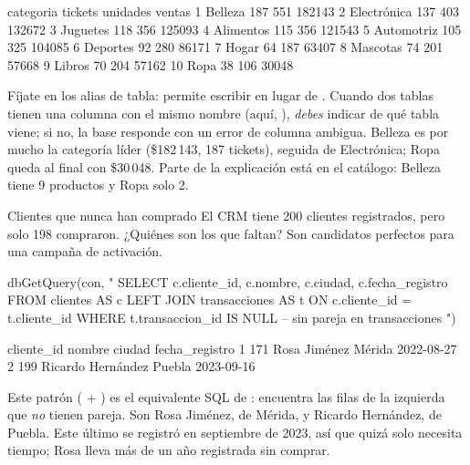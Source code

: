 \begin{rsalida}
     categoria tickets unidades ventas
1      Belleza     187      551 182143
2  Electrónica     137      403 132672
3     Juguetes     118      356 125093
4    Alimentos     115      356 121543
5   Automotriz     105      325 104085
6     Deportes      92      280  86171
7        Hogar      64      187  63407
8     Mascotas      74      201  57668
9       Libros      70      204  57162
10        Ropa      38      106  30048
\end{rsalida}

{\sloppy Fíjate en los alias de tabla:  permite escribir
 en lugar de . Cuando dos
tablas tienen una columna con el mismo nombre (aquí,
), \emph{debes} indicar de qué tabla viene; si no, la
base responde con un error de columna ambigua. Belleza es por mucho la categoría líder
(\$182\,143, 187 tickets), seguida de Electrónica; Ropa queda al final con
\$30\,048. Parte de la explicación está en el catálogo: Belleza tiene 9
productos y Ropa solo 2.\par}

\begin{ejemplo}{Clientes que nunca han comprado}
El CRM tiene 200 clientes registrados, pero solo 198 compraron. ¿Quiénes
son los que faltan? Son candidatos perfectos para una campaña de
activación.
\end{ejemplo}

\begin{rcode}
dbGetQuery(con, "
  SELECT c.cliente_id, c.nombre, c.ciudad, c.fecha_registro
  FROM clientes AS c
  LEFT JOIN transacciones AS t
         ON c.cliente_id = t.cliente_id
  WHERE t.transaccion_id IS NULL   -- sin pareja en transacciones
")
\end{rcode}

\begin{rsalida}
  cliente_id            nombre ciudad fecha_registro
1        171      Rosa Jiménez Mérida     2022-08-27
2        199 Ricardo Hernández Puebla     2023-09-16
\end{rsalida}

Este patrón ( + ) es el
equivalente SQL de : encuentra las filas de la
izquierda que \emph{no} tienen pareja. Son Rosa Jiménez, de Mérida, y Ricardo
Hernández, de Puebla. Este último se registró en septiembre de 2023, así que
quizá solo necesita tiempo; Rosa lleva más de un año registrada sin
comprar.

